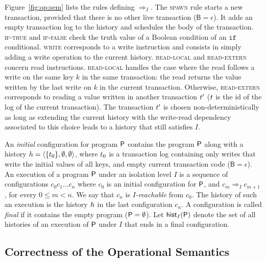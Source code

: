 Figure~\ref{fig:op:sem} lists the rules defining $\Rightarrow_I$. The \textsc{spawn} rule starts a new transaction, provided that there is no other live transaction ($\mathsf{B}=\epsilon$). It adds an empty transaction log to the history and schedules the body of the transaction. \textsc{if-true} and \textsc{if-false} check the truth value of a Boolean condition of an $\mathtt{if}$ conditional. \textsc{write} corresponds to a write instruction and consists in simply adding a write operation to the current history. \textsc{read-local} and \textsc{read-extern} concern read instructions. \textsc{read-local} handles the case where the read follows a write on the same key $k$ in the same transaction: the read returns the value written by the last write on $k$ in the current transaction. Otherwise, \textsc{read-extern} corresponds to reading a value written in another transaction $\tr'$ ($\tr$ is the id of the log of the current transaction). The transaction $\tr'$ is chosen non-deterministically as long as extending the current history with the write-read dependency associated to this choice leads to a history that still satisfies $I$.

An \emph{initial} configuration for program $\prog$ contains the program $\prog$ along with a history $\hist=\tup{\{\tr_0\},\emptyset,\emptyset}$, where $\tr_0$ is a transaction log containing only writes that write the initial values of all keys, and empty current transaction code ($\mathsf{B}=\epsilon$). 
An execution of a program $\prog$ under an isolation level $I$ is a sequence of configurations $c_0 c_1\ldots c_n$ where $c_0$ is an initial configuration for $\prog$, and $c_m\Rightarrow_I c_{m+1}$, for every $0\leq m < n$. We say that $c_n$ is \emph{$I$-reachable} from $c_0$.
The history of such an execution is the history $\hist$ in the last configuration $c_n$. 
A configuration is called \emph{final} if it contains the empty program ($\prog=\emptyset$).
Let $\histOf[I]{\prog}$ denote the set of all histories of an execution of $\prog$ under $I$ that ends in a final configuration.




%
%


\subsection{Correctness of the Operational Semantics}

